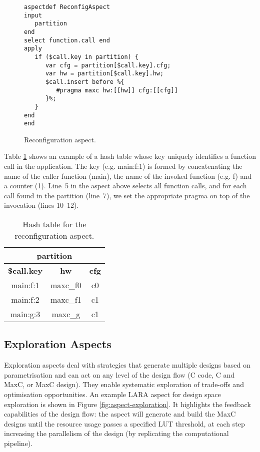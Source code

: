 \lstset{style=lara}
\begin{figure}[!h]
\begin{lstlisting}
aspectdef ReconfigAspect
input
   partition
end
select function.call end
apply
   if ($call.key in partition) {
      var cfg = partition[$call.key].cfg;
      var hw = partition[$call.key].hw;
      $call.insert before %{
         #pragma maxc hw:[[hw]] cfg:[[cfg]]
      }%;
   }
end
end
\end{lstlisting}
\caption{Reconfiguration aspect.}
\label{fig:aspect-reconf}
\end{figure}

Table \ref{fig:aspect-hash} shows an example of a hash table whose key
uniquely identifies a function call in the application. The key
(e.g. main:f:1) is formed by concatenating the name of the caller
function (main), the name of the invoked function (e.g. f) and a
counter (1).  Line~5 in the aspect above selects all function calls,
and for each call found in the partition (line~7), we set the
appropriate pragma on top of the invocation (lines 10--12).
\begin{table}[!h]
\caption{Hash table for the reconfiguration aspect.}
\label{fig:aspect-hash}
\centering
\begin{tabular}{c|c|c}
\hline
\multicolumn{3}{c}{\bf{partition}} \\
\hline
\bf{\$call.key} & \bf{hw} & \bf{cfg}  \\
\hline
main:f:1 & maxc\_f0 & c0 \\
main:f:2 & maxc\_f1 & c1 \\
main:g:3 & maxc\_g & c1 \\
\hline
\end{tabular}
\end{table}



\subsection{Exploration Aspects}

Exploration aspects deal with strategies that generate multiple
designs based on parametrisation and can act on any level of the
design flow (C code, C and MaxC, or MaxC design). They enable
systematic exploration of trade-offs and optimisation
opportunities. An example LARA aspect for design space exploration is
shown in Figure \ref{fig:aspect-exploration}. It highlights the feedback capabilities of the design
flow: the aspect will generate and build the MaxC designs until the
resource usage passes a specified LUT threshold, at each step
increasing the parallelism of the design (by replicating the
computational pipeline).

